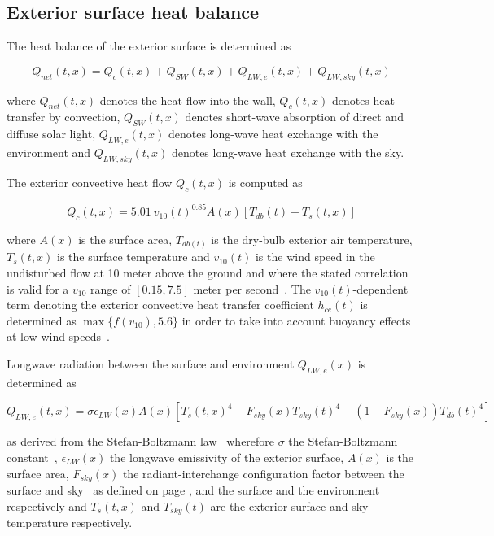 \subsection{Exterior surface heat balance}

The heat balance of the exterior surface is determined as 

\begin{equation}
Q_{net}(t,x) = Q_{c}(t,x) + Q_{SW}(t,x) + Q_{LW,e}(t,x) + Q_{LW,sky}(t,x)
\end{equation}

where $Q_{net}(t,x)$ denotes the heat flow into the wall, $Q_{c}(t,x)$ denotes heat transfer by convection, $Q_{SW}(t,x)$ denotes short-wave absorption of direct and diffuse solar light, $Q_{LW,e}(t,x)$ denotes long-wave heat exchange with the environment and $Q_{LW,sky}(t,x)$ denotes long-wave heat exchange with the sky.

 The exterior convective heat flow $Q_{c}(t,x)$ is computed as

\begin{equation}
Q_{c}(t,x) = 5.01\ v_{10}(t)^{0.85} A(x) \left[T_{db}(t) - T_{s}(t,x)\right]
\end{equation}

where $A(x)$ is the surface area, $T_{db(t)}$ is the dry-bulb exterior air temperature, $T_{s}(t,x)$ is the surface temperature and $v_{10}(t)$ is the wind speed in the undisturbed flow at 10 meter above the ground and where the stated correlation is valid for a $v_{10}$ range of $\left[0.15,7.5\right]$ meter per second~\cite{Defraeye2011}. The $v_{10}(t)$-dependent term denoting the exterior convective heat transfer coefficient $h_{ce}(t)$ is determined as $\max\{f(v_{10}),5.6\}$ in order to take into account buoyancy effects at low wind speeds~\cite{Jurges1924}.

 Longwave radiation between the surface and environment $Q_{LW,e}(x)$ is determined as 

\begin{equation}
Q_{LW,e}(t,x)=\sigma \epsilon_{LW}(x) A(x)  \left[T_{s}(t,x)^{4} - F_{sky}(x)T_{sky}(t)^{4} - (1-F_{sky}(x))T_{db}(t)^{4}\right]
\end{equation}

as derived from the Stefan-Boltzmann law~\cite{Stefan1879,Boltzmann1884} wherefore $\sigma$ the Stefan-Boltzmann constant~\cite{Mohr2008}, $\epsilon_{LW}(x)$ the longwave emissivity of the exterior surface, $A(x)$ is the surface area, $F_{sky}(x)$ the radiant-interchange configuration factor between the surface and sky~\cite{Hamilton1952} as defined on page \pageref{chap:climsol}, and the surface and the environment respectively and $T_{s}(t,x)$ and $T_{sky}(t)$ are the exterior surface and sky temperature respectively.

